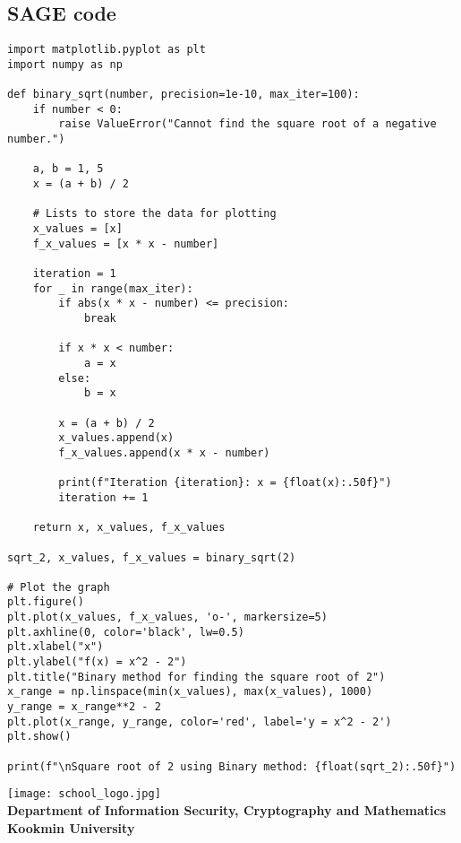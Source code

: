 \documentclass{article}
\newcommand{\footer}[1]{
\begin{flushright}
	\vspace{2em}
	\texttt{[image: school\_logo.jpg]} \\
	\vspace{1em}
	\textcolor{blue2}{\small\textbf{#1}}
\end{flushright}
}
\theoremstyle{definition}
\begin{document}
\subsection{SAGE code}
\begin{lstlisting}[style=sage, caption={Binary Method},captionpos=t]
import matplotlib.pyplot as plt
import numpy as np

def binary_sqrt(number, precision=1e-10, max_iter=100):
	if number < 0:
		raise ValueError("Cannot find the square root of a negative number.")

	a, b = 1, 5
	x = (a + b) / 2

	# Lists to store the data for plotting
	x_values = [x]
	f_x_values = [x * x - number]
	
	iteration = 1
	for _ in range(max_iter):
		if abs(x * x - number) <= precision:
			break
	
		if x * x < number:
			a = x
		else:
			b = x
		
		x = (a + b) / 2
		x_values.append(x)
		f_x_values.append(x * x - number)
		
		print(f"Iteration {iteration}: x = {float(x):.50f}")
		iteration += 1
	
	return x, x_values, f_x_values

sqrt_2, x_values, f_x_values = binary_sqrt(2)

# Plot the graph
plt.figure()
plt.plot(x_values, f_x_values, 'o-', markersize=5)
plt.axhline(0, color='black', lw=0.5)
plt.xlabel("x")
plt.ylabel("f(x) = x^2 - 2")
plt.title("Binary method for finding the square root of 2")
x_range = np.linspace(min(x_values), max(x_values), 1000)
y_range = x_range**2 - 2
plt.plot(x_range, y_range, color='red', label='y = x^2 - 2')
plt.show()

print(f"\nSquare root of 2 using Binary method: {float(sqrt_2):.50f}")
\end{lstlisting}

\footer{Department of Information Security, Cryptography and Mathematics\\ Kookmin University}
\end{document}
